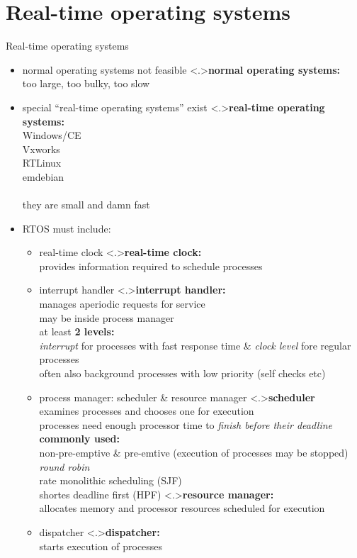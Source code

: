 \documentclass[ngerman={babel}, utf8, bigger, t, xcolor={table,dvipsnames}, ompress, hyperref={bookmarks,colorlinks}]{beamer}
\begin{document}
\section{Real-time operating systems}
\begin{frame}{Real-time operating systems}
	\begin{itemize}
		\item normal operating systems not feasible
		\note<.>{\textbf{normal operating systems:}\\ too large, too bulky, too slow}
		\item special ``real-time operating systems'' exist
		\note<.>{\textbf{real-time operating systems:}\\Windows/CE \\ Vxworks \\ RTLinux \\ emdebian\\ \ \\ they are small and damn fast}
		\item RTOS must include:
		\begin{itemize}
			\item real-time clock
			\note<.>{\textbf{real-time clock:}\\ provides information required to schedule processes}
			\item interrupt handler
			\note<.>{\textbf{interrupt handler:}\\ manages aperiodic requests for service \\ may be inside process manager \\ at least \textbf{2 levels:} \\ \emph{interrupt} for processes with fast response time \& \emph {clock level} fore regular processes \\ often also background processes with low priority {\tiny (self checks etc)}}
			\item process manager: scheduler \& resource manager
			\note<.>{\textbf{scheduler}\\ examines processes and chooses one for execution \\ processes need enough processor time to \emph{finish before their deadline} \\ \textbf{commonly used:} \\ non-pre-emptive \& pre-emtive (execution of processes may be stopped) \\ \emph{round robin} \\ rate monolithic scheduling (SJF) \\ shortes deadline first (HPF) }
			\note<.>{\textbf{resource manager:}\\ allocates memory and processor resources scheduled for execution}
			\item dispatcher
			\note<.>{\textbf{dispatcher:}\\ starts execution of processes}
		\end{itemize}
	\end{itemize}
\end{frame}
\end{document}
